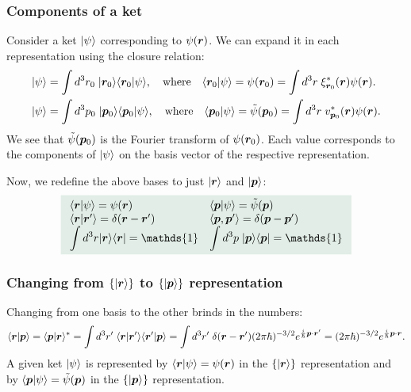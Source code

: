 \subsubsection{Components of a ket}
Consider a ket $|\psi\rangle$ corresponding to $\psi(\bm{r})$. We can expand it in each representation using the closure relation:
\begin{align}
    |\psi\rangle&=\int d^3r_0\;|\bm{r}_0\rangle\langle\bm{r}_0|\psi\rangle,\quad\text{where}\quad\langle\bm{r}_0|\psi\rangle=\psi(\bm{r}_0)=\int d^3r\;\xi^*_{\bm{r}_0}(\bm{r})\psi(\bm{r}).\\
    |\psi\rangle&=\int d^3p_0\;|\bm{p}_0\rangle\langle\bm{p}_0|\psi\rangle,\quad\text{where}\quad\langle\bm{p}_0|\psi\rangle=\tilde{\psi}(\bm{p}_0)=\int d^3r\;v^*_{\bm{p}_0}(\bm{r})\psi(\bm{r}).
\end{align}
We see that $\tilde{\psi}(\bm{p}_0)$ is the Fourier transform of $\psi(\bm{r}_0)$. Each value corresponds to the components of $|\psi\rangle$ on the 
basis vector of the respective representation.

%
Now, we redefine the above bases to just $|\bm{r}\rangle$ and $|\bm{p}\rangle$:
\begin{align}
    \highlight{
    \begin{array}{ll}
        \braket{\bR|\psi}=\psi(\bR)&\braket{\bp|\psi}=\tilde{\psi}(\bp)\\
        \braket{\bR|\bR'}=\delta(\bR-\bR')&\braket{\bp,\bp'}=\delta(\bp-\bp')\\
        \displaystyle\int d^3r\ket{\bR}\bra{\bR}=\mathds{1}&\displaystyle\int d^3p\;\ket{\bp}\bra{\bp}=\mathds{1}
    \end{array}}
    \label{eq:propertiesoperatorsRandP}
\end{align}
%
\subsubsection{Changing from $\{|\bm{r}\rangle\}$ to $\{|\bm{p}\rangle\}$ representation}
Changing from one basis to the other brinds in the numbers:
\begin{align}
    \langle\bm{r}|\bm{p}\rangle=\langle\bm{p}|\bm{r}\rangle^*=\int d^3r'\;\langle\bm{r}|\bm{r}'\rangle\langle\bm{r}'|\bm{p}\rangle=\int d^3r'\;\delta(\bm{r}-\bm{r}')(2\pi\hbar)^{-3/2}e^{\frac{i}{\hbar}\bm{p}\cdot\bm{r}'}=(2\pi\hbar)^{-3/2}e^{\frac{i}{\hbar}\bm{p}\cdot\bm{r}}.
    \label{eq:transformationmatrix}
\end{align}
A given ket $|\psi\rangle$ is represented by $\langle\bm{r}|\psi\rangle=\psi(\bm{r})$ in the $\{|\bm{r}\rangle\}$ representation and by $\langle\bm{p}|\psi\rangle=\tilde{\psi}(\bm{p})$ in the 
$\{|\bm{p}\rangle\}$ representation.

